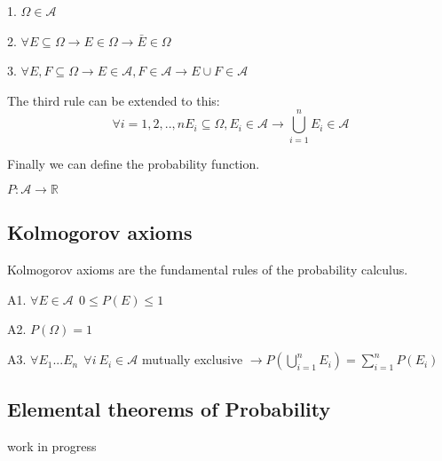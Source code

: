 \documentclass{article}
\begin{document}
1. $\Omega \in \mathcal{A}$

2. $\forall E \subseteq \Omega \longrightarrow E \in \Omega \rightarrow \bar E \in \Omega$

3. $\forall E,F \subseteq \Omega \longrightarrow E \in \mathcal{A}, F \in \mathcal{A} \rightarrow E \cup F \in \mathcal{A}$

The third rule can be extended to this: $$\forall i=1,2,..,n E_i \subseteq \Omega, E_i \in \mathcal{A} \rightarrow \bigcup_{i=1}^nE_i \in \mathcal{A}$$

Finally we can define the probability function.

$P  :  \mathcal{A} \rightarrow \mathbb{R}$

\subsection{Kolmogorov axioms}

Kolmogorov axioms are the fundamental rules of the probability calculus.

A1. $\forall E \in \mathcal{A} \ \ 0 \leq P(E) \leq 1$

A2. $P(\Omega) = 1$

A3. $\forall E_1...E_n \ \ \forall i \ E_i \in \mathcal{A}$ mutually exclusive $\rightarrow P(\bigcup_{i=1}^nE_i) = \sum_{i=1}^nP(E_i)$

\subsection{Elemental theorems of Probability}

work in progress
\end{document}
